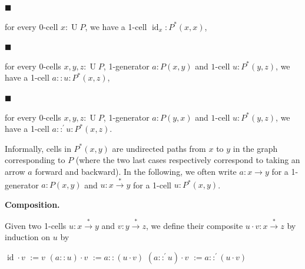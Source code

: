 \documentclass[10pt,a4paper]{amsart}
\begin{document}
\par\noindent  $\blacksquare$ 
 
for every 0-cell $x:\operatorname{U}P$, we have a 1-cell $\operatorname{id}_{x}:P^{*}(x,x)$,\par
 
 
 
\par\noindent  $\blacksquare$ 
 
for every 0-cells $x,y,z:\operatorname{U}P$, 1-generator $a:P(x,y)$ and $1$-cell $u:P^{*}(y,z)$, we have a 1-cell $a::u:P^{*}(x,z)$,\par
 
 
 
\par\noindent  $\blacksquare$ 
 
for every 0-cells $x,y,z:\operatorname{U}P$, 1-generator $a:P(y,x)$ and $1$-cell $u:P^{*}(y,z)$, we have a 1-cell $a::^{\prime}u:P^{*}(x,z)$.\par
 
 
  
Informally, cells in $P^{*}(x,y)$ are undirected paths from $x$ to $y$ in the graph corresponding to $P$ (where the two last cases respectively correspond to taking an arrow $a$ forward and backward). In the following, we often write $a:x\to y$ for a 1-generator $a:P(x,y)$ and $u:x\overset{*}{\to}y$ for a 1-cell $u:P^{*}(x,y)$.\par
 
 
 
 
\par\medskip\noindent\textbf{Composition.}\par
 
 
Given two 1-cells $u:x\overset{*}{\to}y$ and $v:y\overset{*}{\to}z$, we define their composite $u\cdot{}v:x\overset{*}{\to}z$ by induction on $u$ by\par
    $\displaystyle\operatorname{id}\cdot{}v$ $\displaystyle:=v$ $\displaystyle(a::u)\cdot{}v$ $\displaystyle:=a::(u\cdot{}v)$ $\displaystyle(a::^{\prime}u)\cdot{}v$ $\displaystyle:=a::^{\prime}(u\cdot{}v)$    
 
 
\end{document}
